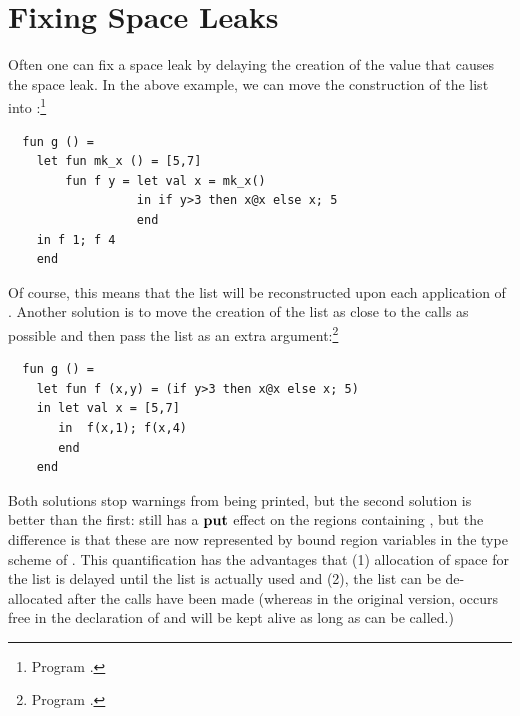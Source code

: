 \documentclass[12pt]{book}
\begin{document}
\section{Fixing Space Leaks}
Often one can fix a space leak by delaying the creation of the value
that causes the space leak. In the above example, we can move the
construction of the list into :\footnote{Program
  .}
\begin{verbatim}
  fun g () =
    let fun mk_x () = [5,7]
        fun f y = let val x = mk_x()
                  in if y>3 then x@x else x; 5
                  end
    in f 1; f 4
    end
\end{verbatim}
Of course, this means that the list will be reconstructed upon each
application of . Another solution is to move the creation of
the list as close to the calls as possible and then pass the list as
an extra argument:\footnote{Program .}
\begin{verbatim}
  fun g () =
    let fun f (x,y) = (if y>3 then x@x else x; 5)
    in let val x = [5,7]
       in  f(x,1); f(x,4)
       end
    end
\end{verbatim}
Both solutions stop warnings from being printed, but the second
solution is better than the first:  still has a $\mathop{\bf put}\nolimits$ effect on
the regions containing , but the difference is that these are
now represented by bound region variables in the type scheme of
. This quantification has the advantages that (1) allocation
of space for the list is delayed until the list is actually used and
(2), the list can be de-allocated after the calls have been made
(whereas in the original version,  occurs free in the
declaration of  and will be kept alive as long as 
can be called.)
\end{document}
